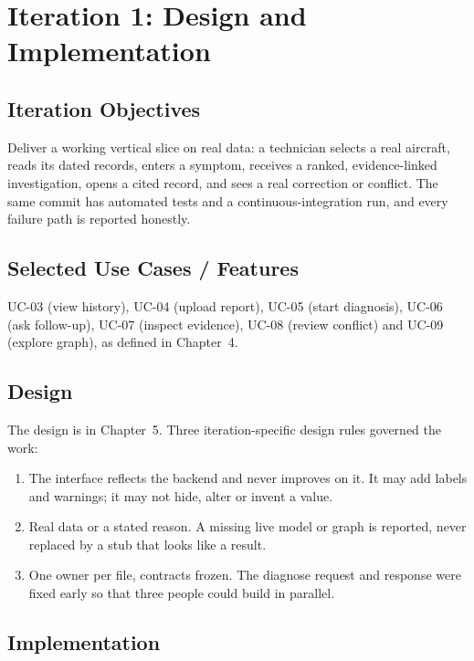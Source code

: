 \chapter{Iteration 1: Design and Implementation}

\section{Iteration Objectives}

Deliver a working vertical slice on real data: a technician selects a real aircraft, reads its dated records, enters a symptom, receives a ranked, evidence-linked investigation, opens a cited record, and sees a real correction or conflict. The same commit has automated tests and a continuous-integration run, and every failure path is reported honestly.

\section{Selected Use Cases / Features}

UC-03 (view history), UC-04 (upload report), UC-05 (start diagnosis), UC-06 (ask follow-up), UC-07 (inspect evidence), UC-08 (review conflict) and UC-09 (explore graph), as defined in Chapter~4.

\section{Design}

The design is in Chapter~5. Three iteration-specific design rules governed the work:

\begin{enumerate}
\item The interface reflects the backend and never improves on it. It may add labels and warnings; it may not hide, alter or invent a value.
\item Real data or a stated reason. A missing live model or graph is reported, never replaced by a stub that looks like a result.
\item One owner per file, contracts frozen. The diagnose request and response were fixed early so that three people could build in parallel.
\end{enumerate}

\section{Implementation}

